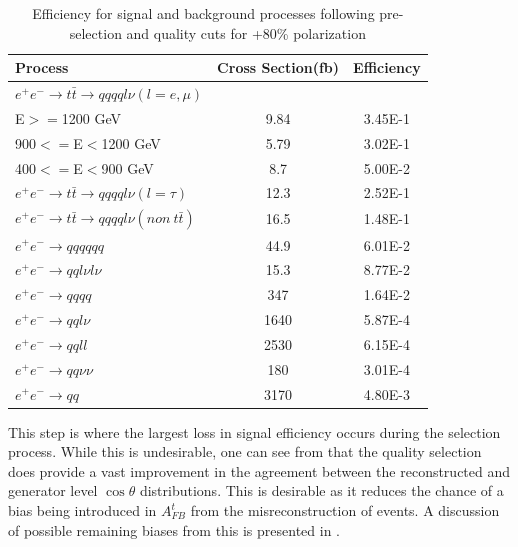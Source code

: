 \begin{table}
  \centering
  \begin{tabular}{l | c | c }
    \toprule
    Process     & Cross Section(fb) & Efficiency \\
    \midrule
    $e^+e^-\rightarrow t\bar{t} \rightarrow qqqql\nu (l=e,\mu)$&  &  \\
    E$>=$1200 GeV & 9.84 & 3.45E-1 \\
    900$<=$E$<$1200 GeV & 5.79 & 3.02E-1 \\
    400$<=$E$<$900 GeV & 8.7 & 5.00E-2 \\
    \midrule
    $e^+e^-\rightarrow t\bar{t} \rightarrow qqqql\nu (l=\tau)$& 12.3 & 2.52E-1\\
    \midrule
    $e^+e^-\rightarrow t\bar{t} \rightarrow qqqql\nu (non ~ t\bar{t})$& 16.5 & 1.48E-1\\
    \midrule
    $e^+e^-\rightarrow qqqqqq$ & 44.9 & 6.01E-2 \\
    \midrule
    $e^+e^-\rightarrow qql\nu l\nu$ & 15.3  & 8.77E-2 \\
    \midrule
    $e^+e^-\rightarrow qqqq$ & 347 & 1.64E-2 \\
    \midrule
    $e^+e^-\rightarrow qql\nu$ & 1640 & 5.87E-4 \\
    \midrule
    $e^+e^-\rightarrow qqll$ & 2530 & 6.15E-4 \\
    \midrule
    $e^+e^-\rightarrow qq\nu\nu$ & 180 & 3.01E-4 \\
    \midrule
    $e^+e^-\rightarrow qq$ & 3170 & 4.80E-3 \\
    \bottomrule
  \end{tabular}
  \caption{Efficiency for signal and background processes following pre-selection and quality cuts for +80\% polarization}
  \label{table:topqualpos}
\end{table}

This step is where the largest loss in signal efficiency occurs during the selection process. While this is undesirable, one can see from  that the quality selection does provide a vast improvement in the agreement between the reconstructed and generator level $\cos\theta$ distributions. This is desirable as it reduces the chance of a bias being introduced in $A_{FB}^t$ from the misreconstruction of events. A discussion of possible remaining biases from this is presented in . 

